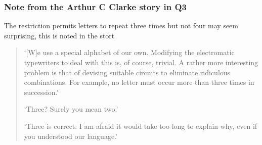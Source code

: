 \documentclass[11pt,a4paper]{scrartcl}
\begin{document}
\subsubsection*{Note from the Arthur C Clarke story in Q3}

The restriction permits letters to repeat three times but not four may
seem surprising, this is noted in the stort
\begin{quotation}
\lq{}[W]e use a special alphabet of our own. Modifying the electromatic typewriters to deal with this is, of course, trivial. A rather more interesting problem is that of devising suitable circuits to eliminate ridiculous combinations. For example, no letter must occur more than three times in succession.\rq{}

\lq{}Three? Surely you mean two.\rq{}

\lq{}Three is correct: I am afraid it would take too long to explain why, even if you understood our language.\rq{}
\end{quotation}
\end{document}
